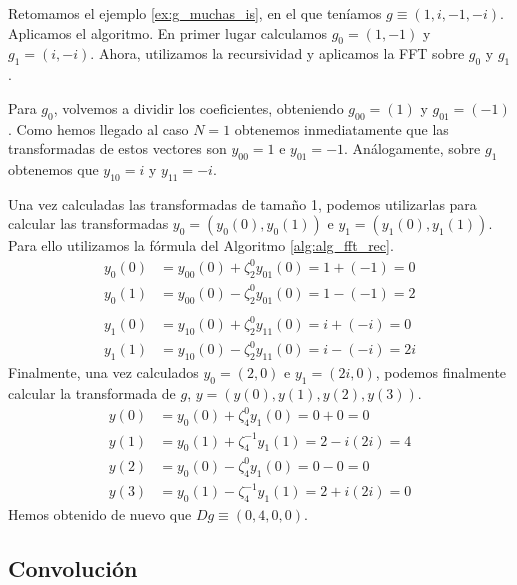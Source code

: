 \documentclass{article}
\begin{document}
\begin{ex}
    Retomamos el ejemplo \ref{ex:g_muchas_is}, en el que teníamos $g \equiv (1, i, -1, -i)$. Aplicamos el algoritmo. En primer lugar calculamos $g_0 = (1,-1)$ y $g_1 = (i,-i)$. Ahora, utilizamos la recursividad y aplicamos la FFT sobre $g_0$ y $g_1$.
    
    Para $g_0$, volvemos a dividir los coeficientes, obteniendo $g_{00} = (1)$ y $g_{01} = (-1)$. Como hemos llegado al caso $N = 1$ obtenemos inmediatamente que las transformadas de estos vectores son $y_{00} = 1$ e $y_{01} = -1$. Análogamente, sobre $g_1$ obtenemos que $y_{10} = i$ y $y_{11} = -i$.
    
    Una vez calculadas las transformadas de tamaño 1, podemos utilizarlas para calcular las transformadas $y_0 = (y_0(0),y_0(1))$ e $y_1 = (y_1(0),y_1(1))$. Para ello utilizamos la fórmula del Algoritmo \ref{alg:alg_fft_rec}.
    \begin{align*}
        y_0(0) &= y_{00}(0) + \zeta_2^0y_{01}(0) = 1 +(-1) = 0 \\
        y_0(1) &= y_{00}(0) - \zeta_2^0y_{01}(0) = 1 -(-1) = 2 \\
        \\
        y_1(0) &= y_{10}(0) + \zeta_2^0y_{11}(0) = i +(-i) = 0 \\
        y_1(1) &= y_{10}(0) - \zeta_2^0y_{11}(0) = i -(-i) = 2i
    \end{align*}
    Finalmente, una vez calculados $y_0 = (2,0)$ e $y_1 = (2i,0)$, podemos finalmente calcular la transformada de $g$, $y = (y(0),y(1),y(2),y(3))$.
    \begin{align*}
        y(0) &= y_0(0) + \zeta_4^0y_1(0) = 0 + 0 = 0 \\
        y(1) &= y_0(1) + \zeta_4^{-1}y_1(1) = 2 -i(2i) = 4 \\
        y(2) &= y_0(0) - \zeta_4^0y_1(0) = 0 - 0 = 0 \\
        y(3) &= y_0(1) - \zeta_4^{-1}y_1(1) = 2 +i(2i) = 0
    \end{align*}
    Hemos obtenido de nuevo que $Dg \equiv (0,4,0,0)$.
\end{ex}

\subsection{Convolución} \label{sec:fft:conv}
\end{document}
